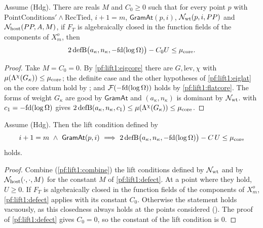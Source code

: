 \begin{proposition}\label{pf:lift1:defect}
Assume (Hdg). There are reals $M$ and $C_0\ge0$ such that for every point $p$ with
$\mathrm{PointConditions}'\wedge\mathrm{RecTied}$, $i+1=m$, $\mathsf{GramAt}(p,i)$,
$\mathcal N_{\mathrm{wt}}(p,i,PP)$ and $\mathcal N_{\mathrm{host}}(PP,A,M)$, if $F_T$ is algebraically closed in the
function fields of the components of $X^o_m$, then
\[
2\,\mathrm{defB}\bigl(a_\kappa,n_\kappa,-\mathrm{fd}(\log\Omega)\bigr)-C_0U\le\mu_{\mathrm{core}}.
\]
\end{proposition}

\begin{proof}
Take $M=C_0=0$. By \cref{pf:lift1:eigcore} there are $G,\mathrm{lev},\chi$ with
$\mu(\Lambda^{\chi}(G_\kappa))\le\mu_{\mathrm{core}}$; the definite case and the other hypotheses of
\cref{pf:lift1:eiglat} on the core datum hold by ; and
$\mathcal F(-\mathrm{fd}(\log\Omega))$ holds by \cref{pf:lift1:flatcore}. The forms of
weight $G_\kappa$ are good by $\mathsf{GramAt}$ and $(a_\kappa,n_\kappa)$ is dominant by
$\mathcal N_{\mathrm{wt}}$.  with $c_1=-\mathrm{fd}(\log\Omega)$ gives
$2\,\mathrm{defB}(a_\kappa,n_\kappa,c_1)\le\mu(\Lambda^{\chi}(G_\kappa))\le\mu_{\mathrm{core}}$.
\end{proof}

\begin{corollary}\label{pf:lift1:defectlift}
Assume (Hdg). Then the lift condition defined by
\[
i+1=m\ \wedge\ \mathsf{GramAt}(p,i)\ \Longrightarrow\
2\,\liftonedefB\bigl(a_\kappa,n_\kappa,-\liftoneflat(\liftonelogOm)\bigr)-C\,U\le\liftonemuc
\]
holds.
\end{corollary}

\begin{proof}
Combine (\cref{pf:lift1:combine}) the lift conditions defined by $\mathcal N_{\mathrm{wt}}$ and by
$\mathcal N_{\mathrm{host}}(\cdot,\cdot,M)$ for the constant $M$ of \cref{pf:lift1:defect}. At a point where they
hold, $U\ge0$. If $F_T$ is algebraically closed in the function fields of the components of $X^o_m$,
\cref{pf:lift1:defect} applies with its constant $C_0$. Otherwise the statement holds vacuously, as
this closedness always holds at the points considered
(). The proof of \cref{pf:lift1:defect} gives
$C_0=0$, so the constant of the lift condition is $0$.
\end{proof}

